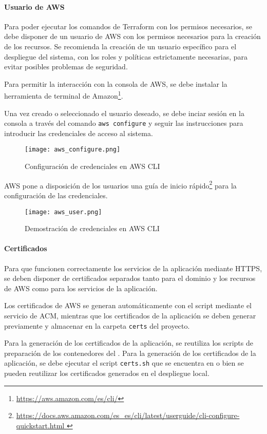 \newpage{}
\paragraph{Usuario de AWS}
Para poder ejecutar los comandos de Terraform con los permisos necesarios, se
debe disponer de un usuario de AWS con los permisos necesarios para la creación
de los recursos. Se recomienda la creación de un usuario específico para el
despliegue del sistema, con los roles y políticas estrictamente necesarias, para
evitar posibles problemas de seguridad.

Para permitir la interacción con la consola de AWS, se debe instalar la
herramienta de terminal de Amazon\footnote{\url{https://aws.amazon.com/es/cli/}}.

Una vez creado o seleccionado el usuario deseado, se debe inciar sesión en la
consola a través del comando \texttt{aws configure} y seguir las instrucciones
para introducir las credenciales de acceso al sistema.

\begin{figure}[H]
	\centering
	\texttt{[image: aws\_configure.png]}
	\caption{Configuración de credenciales en AWS CLI}
	\label{fig:aws_configure}
\end{figure}

AWS pone a disposición de los usuarios una guía de inicio rápido\footnote{\url{
	https://docs.aws.amazon.com/es_es/cli/latest/userguide/cli-configure-quickstart.html
}} para la configuración de las credenciales.

\begin{figure}[H]
	\centering
	\texttt{[image: aws\_user.png]}
	\caption{Demostración de credenciales en AWS CLI}
	\label{fig:aws_user}
\end{figure}


\newpage{}
\paragraph{Certificados}
Para que funcionen correctamente los servicios de la aplicación mediante HTTPS,
se deben disponer de certificados separados tanto para el dominio y los
recursos de AWS como para los servicios de la aplicación.

Los certificados de AWS se generan automáticamente con el script mediante el
servicio de ACM, mientras que los certificados de la aplicación se deben
generar previamente y almacenar en la carpeta \texttt{certs} del proyecto.

Para la generación de los certificados de la aplicación, se reutiliza los
scripts de preparación de los contenedores del .
Para la generación de los certificados de la aplicación, se debe ejecutar
el script \texttt{certs.sh} que se encuentra en  o
bien se pueden reutilizar los certificados generados en el despliegue local.

